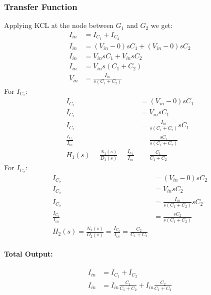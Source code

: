 \subsubsection{Transfer Function}
Applying KCL at the node between \(G_1\) and \(G_2\) we get:
\begin{align*}
  I_{in} &= I_{C_1} + I_{C_2} \\
  I_{in} &= (V_{in} - 0)sC_1 + (V_{in} - 0)sC_2 \\
  I_{in} &= V_{in}sC_1 + V_{in}sC_2 \\
  I_{in} &= V_{in}s(C_1 + C_2) \\
  V_{in} &= \frac{I_{in}}{s(C_1 + C_2)}
\end{align*}
For \(I_{C_1}\):
\begin{align*}
  I_{C_1} &= (V_{in} - 0)sC_1 \\
  I_{C_1} &= V_{in}sC_1 \\
  I_{C_1} &= \frac{I_{in}}{s(C_1 + C_2)}sC_1 \\
  \frac{I_{C_1}}{I_{in}} &= \frac{sC_1}{s(C_1 + C_2)} \\
  H_1(s) = \frac{N_1(s)}{D_1(s)} = \frac{I_{C_1}}{I_{in}} &= \frac{C_1}{C_1 + C_2}
\end{align*}
For \(I_{C_2}\):
\begin{align*}
  I_{C_2} &= (V_{in} - 0)sC_2 \\
  I_{C_2} &= V_{in}sC_2 \\
  I_{C_2} &= \frac{I_{in}}{s(C_1 + C_2)}sC_2 \\
  \frac{I_{C_2}}{I_{in}} &= \frac{sC_2}{s(C_1 + C_2)} \\
  H_2(s) = \frac{N_2(s)}{D_2(s)} = \frac{I_{C_2}}{I_{in}} = \frac{C_2}{C_1 + C_2}
\end{align*}
\paragraph{Total Output:}
\begin{align*}
  I_{in} &= I_{C_1} + I_{C_2} \\
  I_{in} &= I_{in} \frac{C_1}{C_1 + C_2} + I_{in} \frac{C_2}{C_1 + C_2}
\end{align*}

